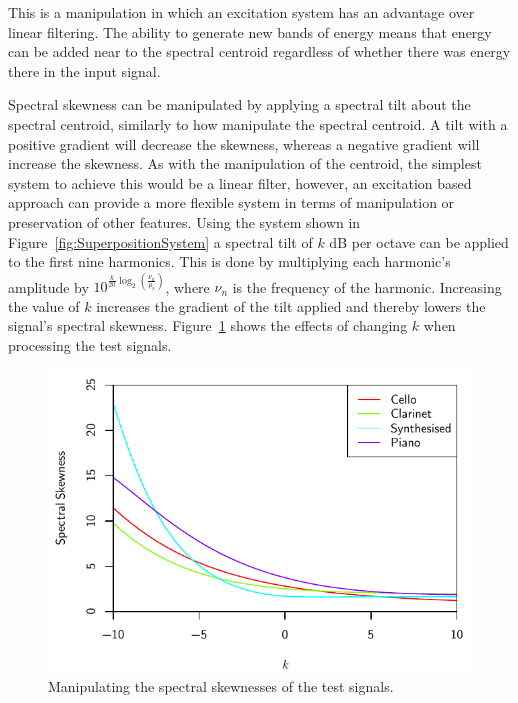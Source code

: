 			This is a manipulation in which an excitation system has an advantage over linear filtering. The
			ability to generate new bands of energy means that energy can be added near to the spectral
			centroid regardless of whether there was energy there in the input signal.

			Spectral skewness can be manipulated by applying a spectral tilt about the spectral centroid,
			similarly to how \citet{williams2007perceptually} manipulate the spectral centroid. A tilt with a
			positive gradient will decrease the skewness, whereas a negative gradient will increase the
			skewness. As with the manipulation of the centroid, the simplest system to achieve this would be a
			linear filter, however, an excitation based approach can provide a more flexible system in terms of
			manipulation or preservation of other features. Using the system shown in
			Figure~\ref{fig:SuperpositionSystem} a spectral tilt of $k$ dB per octave can be applied to the
			first nine harmonics. This is done by multiplying each harmonic's amplitude by
			$10^{\frac{k}{20}\log_{2} \left( \frac{\nu_{n}}{\mu_{\mathrm{s}}} \right)}$, where $\nu_{n}$ is the
			frequency of the harmonic. Increasing the value of $k$ increases the gradient of the tilt applied
			and thereby lowers the signal's spectral skewness.  Figure~\ref{fig:MoveSkewnesses} shows the
			effects of changing $k$ when processing the test signals.

			\begin{figure}[h!]
				\centering
				\includegraphics{chapter6/Images/MoveSkewnesses.pdf}
				\caption{Manipulating the spectral skewnesses of the test signals.}
				\label{fig:MoveSkewnesses}
			\end{figure}

